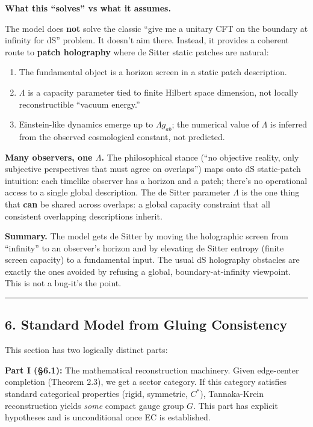 \documentclass[11pt,a4paper]{article}
\theoremstyle{remark}
\providecommand{\tightlist}{%
  \setlength{\itemsep}{0pt}\setlength{\parskip}{0pt}}
\begin{document}
\textbf{What this ``solves'' vs what it assumes.}

The model does \textbf{not} solve the classic ``give me a unitary CFT on the
boundary at infinity for dS'' problem. It doesn't aim there. Instead, it
provides a coherent route to \textbf{patch holography} where de Sitter static
patches are natural:

\begin{enumerate}
\def\labelenumi{\arabic{enumi}.}
\tightlist
\item
  The fundamental object is a horizon screen in a static patch description.
\item
  \(\Lambda\) is a capacity parameter tied to finite Hilbert space dimension,
  not locally reconstructible ``vacuum energy.''
\item
  Einstein-like dynamics emerge up to \(\Lambda g_{ab}\); the numerical
  value of \(\Lambda\) is inferred from the observed cosmological constant,
  not predicted.
\end{enumerate}

\textbf{Many observers, one \(\Lambda\).} The philosophical stance (``no objective
reality, only subjective perspectives that must agree on overlaps'') maps
onto dS static-patch intuition: each timelike observer has a horizon and a
patch; there's no operational access to a single global description. The
de Sitter parameter \(\Lambda\) is the one thing that \textbf{can} be shared
across overlaps: a global capacity constraint that all consistent
overlapping descriptions inherit.

\textbf{Summary.} The model gets de Sitter by moving the holographic screen from
``infinity'' to an observer's horizon and by elevating de Sitter entropy
(finite screen capacity) to a fundamental input. The usual dS holography
obstacles are exactly the ones avoided by refusing a global,
boundary-at-infinity viewpoint. This is not a bug-it's the point.

\begin{center}\rule{0.5\linewidth}{0.5pt}\end{center}

\subsection{6. Standard Model from Gluing Consistency}\label{standard-model-from-gluing-consistency}

This section has two logically distinct parts:

\textbf{Part I (§6.1):} The mathematical reconstruction machinery. Given
edge-center completion (Theorem 2.3), we get a sector category. If this
category satisfies standard categorical properties (rigid, symmetric, \(C^*\)),
Tannaka-Krein reconstruction yields \emph{some} compact gauge group \(G\). This part
has explicit hypotheses and is unconditional once EC is established.
\end{document}
